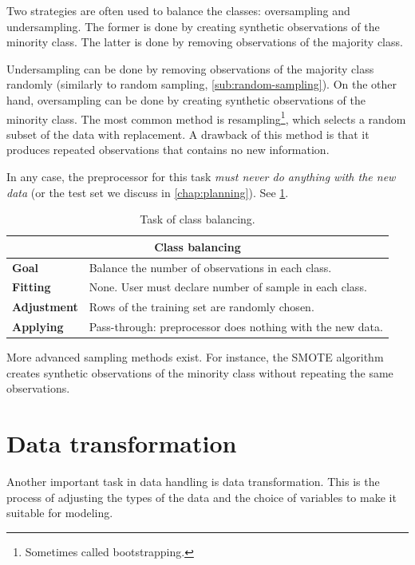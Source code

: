 Two strategies are often used to balance the classes: oversampling and undersampling.  The
former is done by creating synthetic observations of the minority class.  The latter is
done by removing observations of the majority class.

Undersampling can be done by removing observations of the majority class randomly
(similarly to random sampling, \cref{sub:random-sampling}).  On the other hand,
oversampling can be done by creating synthetic observations of the minority class.  The
most common method is resampling\footnote{Sometimes called bootstrapping.}, which selects
a random subset of the data with replacement.  A drawback of this method is that it
produces repeated observations that contains no new information.

In any case, the preprocessor for this task \emph{must never do anything with the new
data} (or the test set we discuss in \cref{chap:planning}).  See
\cref{tab:class-balancing}.

\begin{table}\caption{Task of class balancing.}
  \centering
  \begin{tabular}{lp{6cm}}
    \toprule
    \multicolumn{2}{c}{\textbf{Class balancing}} \\
    \midrule
    \textbf{Goal} &
      Balance the number of observations in each class. \\
    \textbf{Fitting} &
      None. User must declare number of sample in each class. \\
    \textbf{Adjustment} &
      Rows of the training set are randomly chosen. \\
    \textbf{Applying} &
      Pass-through: preprocessor does nothing with the new data. \\
    \bottomrule
  \end{tabular}
  \label{tab:class-balancing}
\end{table}

More advanced sampling methods exist.  For instance, the SMOTE
algorithm creates synthetic observations of the minority
class without repeating the same observations.

\section{Data transformation}

Another important task in data handling is data transformation.  This is the process of
adjusting the types of the data and the choice of variables to make it suitable for
modeling.


